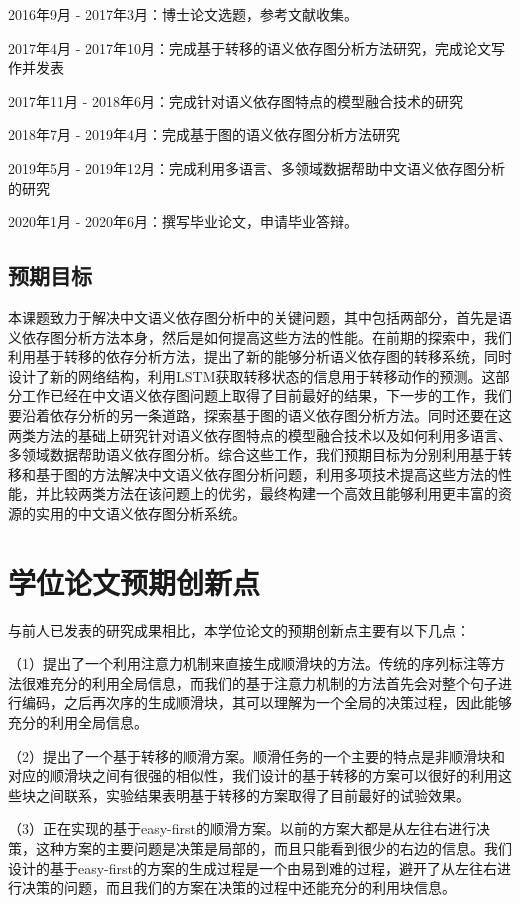 2016年9月 - 2017年3月：博士论文选题，参考文献收集。

2017年4月 - 2017年10月：完成基于转移的语义依存图分析方法研究，完成论文写作并发表

2017年11月 - 2018年6月：完成针对语义依存图特点的模型融合技术的研究

2018年7月 - 2019年4月：完成基于图的语义依存图分析方法研究

2019年5月 - 2019年12月：完成利用多语言、多领域数据帮助中文语义依存图分析的研究

2020年1月 - 2020年6月：撰写毕业论文，申请毕业答辩。


\subsection{预期目标}

本课题致力于解决中文语义依存图分析中的关键问题，其中包括两部分，首先是语义依存图分析方法本身，然后是如何提高这些方法的性能。在前期的探索中，我们利用基于转移的依存分析方法，提出了新的能够分析语义依存图的转移系统，同时设计了新的网络结构，利用LSTM获取转移状态的信息用于转移动作的预测。这部分工作已经在中文语义依存图问题上取得了目前最好的结果，下一步的工作，我们要沿着依存分析的另一条道路，探索基于图的语义依存图分析方法。同时还要在这两类方法的基础上研究针对语义依存图特点的模型融合技术以及如何利用多语言、多领域数据帮助语义依存图分析。综合这些工作，我们预期目标为分别利用基于转移和基于图的方法解决中文语义依存图分析问题，利用多项技术提高这些方法的性能，并比较两类方法在该问题上的优劣，最终构建一个高效且能够利用更丰富的资源的实用的中文语义依存图分析系统。

\section{学位论文预期创新点}
与前人已发表的研究成果相比，本学位论文的预期创新点主要有以下几点：

（1）提出了一个利用注意力机制来直接生成顺滑块的方法。传统的序列标注等方法很难充分的利用全局信息，而我们的基于注意力机制的方法首先会对整个句子进行编码，之后再次序的生成顺滑块，其可以理解为一个全局的决策过程，因此能够充分的利用全局信息。

（2）提出了一个基于转移的顺滑方案。顺滑任务的一个主要的特点是非顺滑块和对应的顺滑块之间有很强的相似性，我们设计的基于转移的方案可以很好的利用这些块之间联系，实验结果表明基于转移的方案取得了目前最好的试验效果。

（3）正在实现的基于easy-first的顺滑方案。以前的方案大都是从左往右进行决策，这种方案的主要问题是决策是局部的，而且只能看到很少的右边的信息。我们设计的基于easy-first的方案的生成过程是一个由易到难的过程，避开了从左往右进行决策的问题，而且我们的方案在决策的过程中还能充分的利用块信息。

